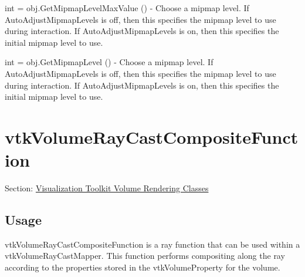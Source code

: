 \begin{DoxyItemize}
\item {\ttfamily int = obj.\-Get\-Mipmap\-Level\-Max\-Value ()} -\/ Choose a mipmap level. If Auto\-Adjust\-Mipmap\-Levels is off, then this specifies the mipmap level to use during interaction. If Auto\-Adjust\-Mipmap\-Levels is on, then this specifies the initial mipmap level to use.  
\item {\ttfamily int = obj.\-Get\-Mipmap\-Level ()} -\/ Choose a mipmap level. If Auto\-Adjust\-Mipmap\-Levels is off, then this specifies the mipmap level to use during interaction. If Auto\-Adjust\-Mipmap\-Levels is on, then this specifies the initial mipmap level to use.  
\end{DoxyItemize}\hypertarget{vtkvolumerendering_vtkvolumeraycastcompositefunction}{}\section{vtk\-Volume\-Ray\-Cast\-Composite\-Function}\label{vtkvolumerendering_vtkvolumeraycastcompositefunction}
Section\-: \hyperlink{sec_vtkvolumerendering}{Visualization Toolkit Volume Rendering Classes} \hypertarget{vtkwidgets_vtkxyplotwidget_Usage}{}\subsection{Usage}\label{vtkwidgets_vtkxyplotwidget_Usage}
vtk\-Volume\-Ray\-Cast\-Composite\-Function is a ray function that can be used within a vtk\-Volume\-Ray\-Cast\-Mapper. This function performs compositing along the ray according to the properties stored in the vtk\-Volume\-Property for the volume.

